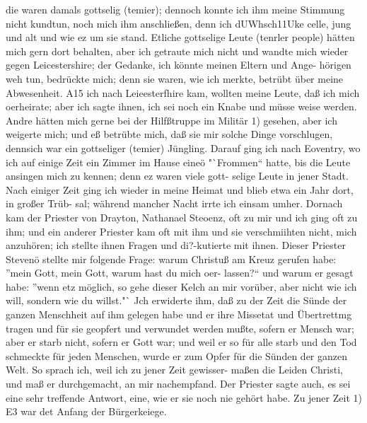 die waren damals gottselig (temier); dennoch konnte ich ihm meine
Stimmung nicht kundtun, noch mich ihm anschließen, denn ich
dUWhsch11Uke celle, jung und alt und wie ez um sie stand. Etliche
gottselige Leute (tenrler people) hätten mich gern dort behalten,
aber ich getraute mich nicht und wandte mich wieder gegen
Leicestershire; der Gedanke, ich könnte meinen Eltern und Ange-
hörigen weh tun, bedrückte mich; denn sie waren, wie ich merkte,
betrübt über meine Abwesenheit.
A15 ich nach Leieesterfhire kam, wollten meine Leute, daß ich
mich oerheirate; aber ich sagte ihnen, ich sei noch ein Knabe und
müsse weise werden. Andre hätten mich gerne bei der Hilfßtruppe
im Militär 1) gesehen, aber ich weigerte mich; und eß betrübte mich,
daß sie mir solche Dinge vorschlugen, dennsich war ein gottseliger
(temier) Jüngling. Darauf ging ich nach Eoventry, wo ich auf
einige Zeit ein Zimmer im Hause eineö "`Frommen"` hatte, bis
die Leute ansingen mich zu kennen; denn ez waren viele gott-
selige Leute in jener Stadt. Nach einiger Zeit ging ich wieder
in meine Heimat und blieb etwa ein Jahr dort, in großer Trüb-
sal; während mancher Nacht irrte ich einsam umher.
Dornach kam der Priester von Drayton, Nathanael Steoenz,
oft zu mir und ich ging oft zu ihm; und ein anderer Priester
kam oft mit ihm und sie verschmiihten nicht, mich anzuhören; ich
stellte ihnen Fragen und di?-kutierte mit ihnen. Dieser Priester
Stevenö stellte mir folgende Frage: warum Christuß am Kreuz
gerufen habe: "'mein Gott, mein Gott, warum hast du mich oer-
lassen?"` und warum er gesagt habe: "'wenn etz möglich, so gehe
dieser Kelch an mir vorüber, aber nicht wie ich will, sondern wie
du willst."` Jch erwiderte ihm, daß zu der Zeit die Sünde der
ganzen Menschheit auf ihm gelegen habe und er ihre Missetat
und Übertrettmg tragen und für sie geopfert und verwundet
werden mußte, sofern er Mensch war; aber er starb nicht, sofern
er Gott war; und weil er so für alle starb und den Tod schmeckte
für jeden Menschen, wurde er zum Opfer für die Sünden der
ganzen Welt. So sprach ich, weil ich zu jener Zeit gewisser-
maßen die Leiden Christi, und maß er durchgemacht, an mir
nachempfand. Der Priester sagte auch, es sei eine sehr treffende
Antwort, eine, wie er sie noch nie gehört habe. Zu jener Zeit
1) E3 war det Anfang der Bürgerkeiege.



